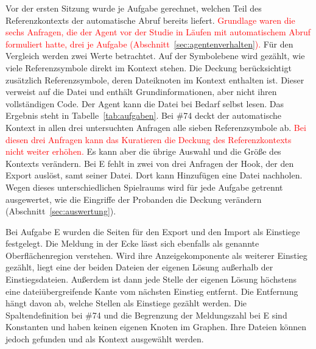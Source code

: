 Vor der ersten Sitzung wurde je Aufgabe gerechnet, welchen Teil des Referenzkontexts der automatische Abruf bereits liefert. \textcolor{red}{Grundlage waren die sechs Anfragen, die der Agent vor der Studie in Läufen mit automatischem Abruf formuliert hatte, drei je Aufgabe (Abschnitt~\ref{sec:agentenverhalten}).} Für den Vergleich werden zwei Werte betrachtet. Auf der Symbolebene wird gezählt, wie viele Referenzsymbole direkt im Kontext stehen. Die Deckung berücksichtigt zusätzlich Referenzsymbole, deren Dateiknoten im Kontext enthalten ist. Dieser verweist auf die Datei und enthält Grundinformationen, aber nicht ihren vollständigen Code. Der Agent kann die Datei bei Bedarf selbst lesen. Das Ergebnis steht in Tabelle~\ref{tab:aufgaben}. Bei \#74 deckt der automatische Kontext in allen drei untersuchten Anfragen alle sieben Referenzsymbole ab. \textcolor{red}{Bei diesen drei Anfragen kann das Kuratieren die Deckung des Referenzkontexts nicht weiter erhöhen.} Es kann aber die übrige Auswahl und die Größe des Kontexts verändern. Bei E fehlt in zwei von drei Anfragen der Hook, der den Export auslöst, samt seiner Datei. Dort kann Hinzufügen eine Datei nachholen. Wegen dieses unterschiedlichen Spielraums wird für jede Aufgabe getrennt ausgewertet, wie die Eingriffe der Probanden die Deckung verändern (Abschnitt~\ref{sec:auswertung}).

Bei Aufgabe E wurden die Seiten für den Export und den Import als Einstiege festgelegt. Die Meldung in der Ecke lässt sich ebenfalls als genannte Oberflächenregion verstehen. Wird ihre Anzeigekomponente als weiterer Einstieg gezählt, liegt eine der beiden Dateien der eigenen Lösung außerhalb der Einstiegsdateien. Außerdem ist dann jede Stelle der eigenen Lösung höchstens eine dateiübergreifende Kante vom nächsten Einstieg entfernt. Die Entfernung hängt davon ab, welche Stellen als Einstiege gezählt werden. Die Spaltendefinition bei \#74 und die Begrenzung der Meldungszahl bei E sind Konstanten und haben keinen eigenen Knoten im Graphen. Ihre Dateien können jedoch gefunden und als Kontext ausgewählt werden.



